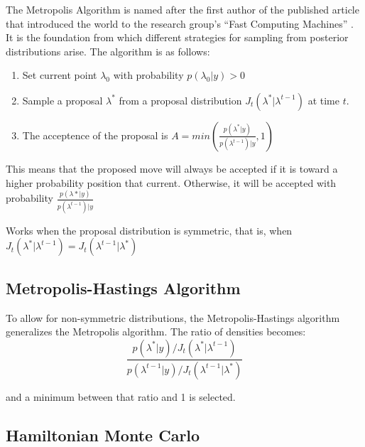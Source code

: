 The Metropolis Algorithm is named after the first author of the published article that introduced the world to the research group's ``Fast Computing Machines'' \cite{metropolis1953equation}.  It is the foundation from which different strategies for sampling from posterior distributions arise.  The algorithm is as follows:

\begin{enumerate}
\tightlist
\item{Set current point $\lambda_0$ with probability $p(\lambda_0|y) > 0$}

\item{Sample a proposal $\lambda^*$ from a proposal distribution $J_t(\lambda^* | \lambda^{t-1})$ at time $t$.}

\item{The acceptence of the proposal is $A = min \left( \frac{p(\lambda^*|y)}{p(\lambda^{t-1})|y} , 1 \right) $}
\end{enumerate}

This means that the proposed move will always be accepted if it is toward a higher probability position that current.  Otherwise, it will be accepted with probability $\frac{p(\lambda*|y)}{p(\lambda^{t-1})|y}$

Works when the proposal distribution is symmetric, that is, when $J_t(\lambda^* | \lambda^{t-1}) = J_t(\lambda^{t-1} | \lambda^*)$

\subsection{Metropolis-Hastings Algorithm}

To allow for non-symmetric distributions, the Metropolis-Hastings algorithm generalizes the Metropolis algorithm.  The ratio of densities becomes:
$$
\frac{ p(\lambda^*|y) / J_t(\lambda^* | \lambda^{t-1}) }{ p(\lambda^{t-1}|y) / J_t(\lambda^{t-1} | \lambda^*) }
$$

and a minimum between that ratio and 1 is selected.

\subsection{Hamiltonian Monte Carlo}

